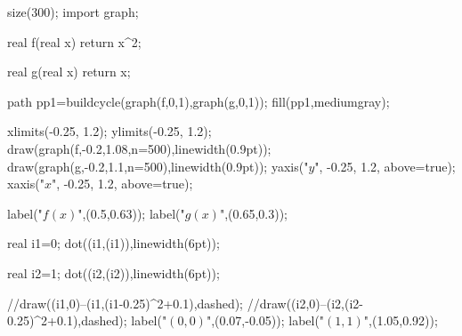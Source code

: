 	size(300);  
    import graph;

    real f(real x)
    {
    	return x^2;
    }
    
    real g(real x)
    {
    	return x;
    }
    
    path pp1=buildcycle(graph(f,0,1),graph(g,0,1));
    fill(pp1,mediumgray);
    
    xlimits(-0.25, 1.2);
	ylimits(-0.25, 1.2);
    draw(graph(f,-0.2,1.08,n=500),linewidth(0.9pt));
    draw(graph(g,-0.2,1.1,n=500),linewidth(0.9pt));
	yaxis("$y$", -0.25, 1.2, above=true);
	xaxis("$x$", -0.25, 1.2, above=true);
	
	label("$f(x)$",(0.5,0.63));
	label("$g(x)$",(0.65,0.3));
	
	real i1=0;
	dot((i1,(i1)),linewidth(6pt));
	
	real i2=1;
	dot((i2,(i2)),linewidth(6pt));
	
	//draw((i1,0)--(i1,(i1-0.25)^2+0.1),dashed);
	//draw((i2,0)--(i2,(i2-0.25)^2+0.1),dashed);
	label("$(0,0)$",(0.07,-0.05));
	label("$(1,1)$",(1.05,0.92));